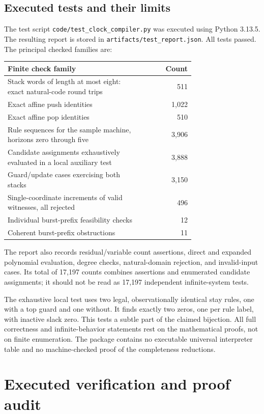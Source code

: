 \documentclass[11pt,letterpaper]{article}
\theoremstyle{definition}
\theoremstyle{remark}
\newcommand{\code}[1]{\texttt{#1}}
\newcommand{\1}{\mathbf 1}
\newcommand{\srctag}[1]{\texorpdfstring{\hspace{0.4em}{\normalfont\small\color{accent}[source #1]}}{ [source #1]}}
\begin{document}
\subsection{Executed tests and their limits}
The test script \code{code/test\_clock\_compiler.py} was executed using
Python 3.13.5. The resulting report is stored in
\code{artifacts/test\_report.json}. All tests passed. The principal checked
families are:
\begin{center}
\begin{tabular}{@{}p{0.73\linewidth}r@{}}
\toprule
Finite check family & Count\\
\midrule
Stack words of length at most eight: exact natural-code round trips & 511\\
Exact affine push identities & 1,022\\
Exact affine pop identities & 510\\
Rule sequences for the sample machine, horizons zero through five & 3,906\\
Candidate assignments exhaustively evaluated in a local auxiliary test & 3,888\\
Guard/update cases exercising both stacks & 3,150\\
Single-coordinate increments of valid witnesses, all rejected & 496\\
Individual burst-prefix feasibility checks & 12\\
Coherent burst-prefix obstructions & 11\\
\bottomrule
\end{tabular}
\end{center}
The report also records residual/variable count assertions, direct and
expanded polynomial evaluation, degree checks, natural-domain rejection,
and invalid-input cases. Its total of 17,197 counts combines assertions
and enumerated candidate assignments; it should not be read as 17,197
independent infinite-system tests.

The exhaustive local test uses two legal, observationally identical stay
rules, one with a top guard and one without. It finds exactly two zeros,
one per rule label, with inactive slack zero. This tests a subtle part of
the claimed bijection. All full correctness and infinite-behavior statements
rest on the mathematical proofs, not on finite enumeration. The package
contains no executable universal interpreter table and no machine-checked
proof of the completeness reductions.
\section{Executed verification and proof audit\srctag{03}}\label{lbh:qd:sec:verification}
\end{document}
